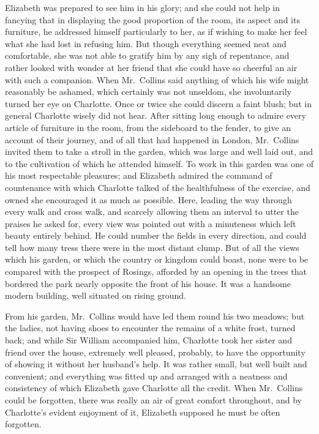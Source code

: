 \documentclass[12pt,english]{book}
\begin{document}
Elizabeth was prepared to see him in his glory; and she could not
help in fancying that in displaying the good proportion of the room,
its aspect and its furniture, he addressed himself particularly to
her, as if wishing to make her feel what she had lost in refusing
him. But though everything seemed neat and comfortable, she was not
able to gratify him by any sigh of repentance, and rather looked with
wonder at her friend that she could have so cheerful an air with such
a companion. When Mr.\ Collins said anything of which his wife might
reasonably be ashamed, which certainly was not unseldom, she involuntarily
turned her eye on Charlotte. Once or twice she could discern a faint
blush; but in general Charlotte wisely did not hear. After sitting
long enough to admire every article of furniture in the room, from
the sideboard to the fender, to give an account of their journey,
and of all that had happened in London, Mr.\ Collins invited them
to take a stroll in the garden, which was large and well laid out,
and to the cultivation of which he attended himself. To work in this
garden was one of his most respectable pleasures; and Elizabeth admired
the command of countenance with which Charlotte talked of the healthfulness
of the exercise, and owned she encouraged it as much as possible.
Here, leading the way through every walk and cross walk, and scarcely
allowing them an interval to utter the praises he asked for, every
view was pointed out with a minuteness which left beauty entirely
behind. He could number the fields in every direction, and could tell
how many tress there were in the most distant clump. But of all the
views which his garden, or which the country or kingdom could boast,
none were to be compared with the prospect of Rosings, afforded by
an opening in the trees that bordered the park nearly opposite the
front of his house. It was a handsome modern building, well situated
on rising ground.

From his garden, Mr.\ Collins would have led them round his two meadows;
but the ladies, not having shoes to encounter the remains of a white
frost, turned back; and while Sir William accompanied him, Charlotte
took her sister and friend over the house, extremely well pleased,
probably, to have the opportunity of showing it without her husband's
help. It was rather small, but well built and convenient; and everything
was fitted up and arranged with a neatness and consistency of which
Elizabeth gave Charlotte all the credit. When Mr.\ Collins could
be forgotten, there was really an air of great comfort throughout,
and by Charlotte's evident enjoyment of it, Elizabeth supposed he
must be often forgotten.
\end{document}
